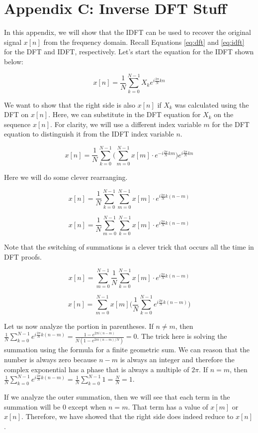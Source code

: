 \section*{Appendix C: Inverse DFT Stuff}

In this appendix, we will show that the IDFT can be used to recover the original signal $x[n]$ from the
frequency domain.  Recall Equations \ref{eq:dft} and \ref{eq:idft} for the DFT and IDFT, respectively.  Let's
start the equation for the IDFT shown below:

$$ x[n] = \frac{1}{N}\sum_{k = 0}^{N - 1} X_k e^{i\frac{2\pi}{N}kn}$$

We want to show that the right side is also $x[n]$ if $X_k$ was calculated using the DFT on $x[n]$.  Here,
we can substitute in the DFT equation for $X_k$ on the sequence $x[n]$.  For clarity, we will use a different
index variable $m$ for the DFT equation to distinguish it from the IDFT index variable $n$.

$$ x[n] = \frac{1}{N}\sum_{k = 0}^{N - 1} \bigg(\sum_{m = 0}^{N - 1}x[m] \cdot e^{-i\frac{2\pi}{N}km} \bigg) e^{i\frac{2\pi}{N}kn}$$

Here we will do some clever rearranging.

$$x[n] = \frac{1}{N}\sum_{k = 0}^{N - 1} \sum_{m = 0}^{N - 1}x[m] \cdot e^{i\frac{2\pi}{N}k(n - m)} $$

$$x[n] = \frac{1}{N}\sum_{m = 0}^{N - 1} \sum_{k = 0}^{N - 1}x[m] \cdot e^{i\frac{2\pi}{N}k(n - m)} $$

Note that the switching of summations is a clever trick that occurs all the time in DFT proofs.

$$x[n] = \sum_{m = 0}^{N - 1} \frac{1}{N}\sum_{k = 0}^{N - 1}x[m] \cdot e^{i\frac{2\pi}{N}k(n - m)} $$

$$x[n] = \sum_{m = 0}^{N - 1} x[m] \bigg(\frac{1}{N}\sum_{k = 0}^{N - 1} e^{i\frac{2\pi}{N}k(n - m)} \bigg)$$

Let us now analyze the portion in parentheses.  If $n \neq m$, then $\frac{1}{N}\sum_{k = 0}^{N - 1}
 e^{i\frac{2\pi}{N}k(n - m)} = \frac{1 - e^{2\pi i (n -m)}}{N(1 - e^{2\pi i (n -m)/N})} = 0$.  The trick here is
 solving the summation using the formula for a finite geometric sum.  We can reason that the number is always
 zero because $n - m$ is always an integer and therefore the complex exponential has a phase that is always
 a multiple of $2\pi$.  If $n = m$, then $\frac{1}{N}\sum_{k = 0}^{N - 1} e^{i\frac{2\pi}{N}k(n - m)} = \frac{1}{N}\sum_{k = 0}^{N - 1}1 = \frac{N}{N} = 1$.  
 
 If we analyze the outer summation, then we will see that each term in the summation will be 0 except when
 $n = m$.  That term has a value of $x[m]$ or $x[n]$.  Therefore, we have showed that the right side does
 indeed reduce to $x[n]$.  